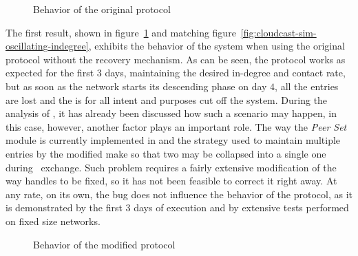 \begin{figure}[h!]
  \centering
  \caption{Behavior of the original \peersampling protocol}
  \label{fig:cloudcast-dynamic-original}
\end{figure}


The first result, shown in figure~\ref{fig:cloudcast-dynamic-original}
and matching figure~\ref{fig:cloudcast-sim-oscillating-indegree},
exhibits the behavior of the system when using the original protocol
without the recovery mechanism. As can be seen, the protocol works as
expected for the first $3$ days, maintaining the desired \cloud
in-degree and contact rate, but as soon as the network starts its
descending phase on day $4$, all the \cloud entries are lost and the
\cloud is for all intent and purposes cut off the system. During the
analysis of \cloudcast, it has already been discussed how such a scenario
may happen, in this case, however, another factor plays an important
role. The way the \emph{Peer Set} module is currently implemented in
\grapes and the strategy used to maintain multiple \cloud entries by
the modified \cyclon make so that two \cloud \descriptor may be
collapsed into a single one during \view\ exchange. Such problem
requires a fairly extensive modification of the way \grapes handles
\descriptors to be fixed, so it has not been feasible to correct it right
away. At any rate, on its own, the bug does not influence the behavior of
the protocol, as it is demonstrated by the first $3$ days of execution
and by extensive tests performed on fixed size networks.

\begin{figure}[h!]
  \centering
  \caption{Behavior of the modified \peersampling protocol}
  \label{fig:cloudcast-dynamic-additions}
\end{figure}


